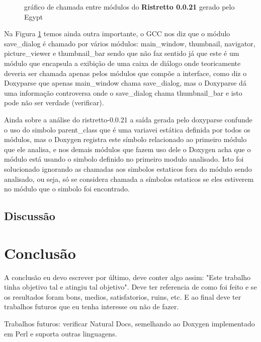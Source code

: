 \begin{figure}
\caption{gráfico de chamada entre módulos do {\bf Ristretto 0.0.21} gerado pelo Egypt}
\label{ristretto-0.0.21}
\end{figure}

Na Figura \ref{ristretto-0.0.21} temos ainda outra importante, o GCC nos diz que o módulo save\_dialog é chamado por vários módulos: main\_window, thumbnail, navigator, picture\_viewer e thumbnail\_bar sendo que não faz sentido já que este é um módulo que encapsula a exibição de uma caixa de diálogo onde teoricamente deveria ser chamada apenas pelos módulos que compõe a interface, como diz o Doxyparse que apenas main\_window chama save\_dialog, mas o Doxyparse dá uma informação controversa onde o save\_dialog chama thumbnail\_bar e isto pode não ser verdade (verificar).

Ainda sobre a análise do ristretto-0.0.21 a saída gerada pelo doxyparse confunde o uso do simbolo parent\_class que é uma variavei estática definida por todos os módulos, mas o Doxygen registra este símbolo relacionado ao primeiro módulo que ele analisa, e nos demais módulos que fazem uso dele o Doxygen acha que o módulo está usando o simbolo definido no primeiro modulo analisado. Isto foi solucionado ignorando as chamadas aos simbolos estaticos fora do módulo sendo analisado, ou seja, só se considera chamada a símbolos estaticos se eles estiverem no módulo que o simbolo foi encontrado.

\section{Discussão}

\chapter{Conclusão}

A conclusão eu devo escrever por último, deve conter algo assim: "Este trabalho tinha objetivo tal e atingiu tal objetivo". Deve ter referencia de como foi feito e se os resultados foram bons, medios, satisfatorios, ruins, etc. E ao final deve ter trabalhos futuros que eu tenha interesse ou não de fazer.

Trabalhos futuros: verificar Natural Docs, semelhando ao Doxygen implementado em Perl e suporta outras linguagens.
